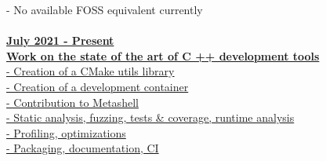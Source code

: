 \documentclass[a4paper]{article}
\begin{document}
{\begin{minipage}[t]{0.6\paperwidth}
{\begin{minipage}[H]{0.58\paperwidth}
{		\hspace{2cm} - No available FOSS equivalent currently\\
		}
		\ \\
		\href{https://github.com/conformism/cmake-utils}{
		\textbf{July 2021 - Present}\\
		\hspace{1cm} \textbf{Work on the state of the art of C ++ development tools}\\
		\hspace{2cm} - Creation of a CMake utils library\\
		\hspace{2cm} - Creation of a development container\\
		\hspace{2cm} - Contribution to Metashell\\
		\hspace{2cm} - Static analysis, fuzzing, tests \& coverage, runtime analysis\\
		\hspace{2cm} - Profiling, optimizations\\
		\hspace{2cm} - Packaging, documentation, CI\\
		}
		\end{minipage}\if{}} \fi

	\vspace{0.5cm}%
	\\
	\vspace{0.5cm}
	\if{} \fi
	\end{minipage}\if{}} \fi
\end{document}
